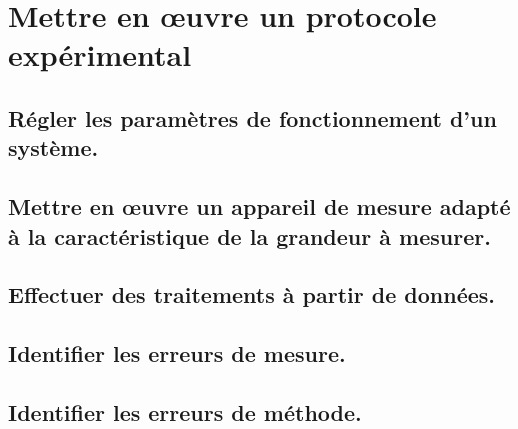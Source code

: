 \documentclass[10pt,fleqn]{book}
\begin{document}
\begin{multicols}{2} 

\end{multicols}

\section{Mettre en œuvre un protocole expérimental} 

\subsection{Régler les paramètres de fonctionnement d'un système.} 

\begin{multicols}{2} 

\end{multicols}

\subsection{Mettre en œuvre un appareil de mesure adapté à la caractéristique de la grandeur à mesurer.} 

\begin{multicols}{2} 

\end{multicols}

\subsection{Effectuer des traitements à partir de données. } 

\begin{multicols}{2} 

\end{multicols}

\subsection{Identifier les erreurs de mesure.} 

\begin{multicols}{2} 

\end{multicols}

\subsection{Identifier les erreurs de méthode.} 

\begin{multicols}{2} 

\end{multicols}
\end{document}
